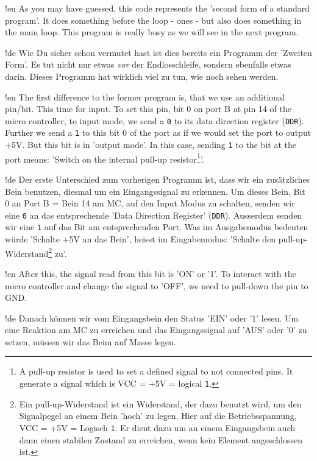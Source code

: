 !en As you may have guessed, this code represents the 'second form of a standard program'. It does something before the loop - ones - but also does something in the main loop. This program is really busy as we will see in the next program.

!de Wie Du sicher schon vermutet hast ist dies bereits ein Programm der 'Zweiten Form'. Es tut nicht nur etwas \textit{vor} der Endlosschleife, sondern ebenfalls etwas darin. Dieses Programm hat wirklich viel zu tun, wie noch sehen werden.



!en The first difference to the former program is, that we use an additional pin/bit. This time for input. To set this pin, bit 0 on port B at pin 14 of the micro controller, to input mode, we send a \texttt{0} to its data direction register (\texttt{DDR}). Further we send a \texttt{1} to this bit 0 of the port as if we would set the port to output +5V. But this bit is in 'output mode'. In this case, sending \texttt{1} to the bit at the port means: 'Switch on the internal pull-up resistor\footnote{A pull-up resistor is used to set a defined signal to not connected pins. It generate a signal which is VCC = +5V = logical \texttt{1}.}'.

!de Der erste Unterschied zum vorherigen Programm ist, dass wir ein zusätzliches Bein benutzen, diesmal um ein Eingangssignal zu erkennen. Um dieses Bein, Bit 0 an Port B = Bein 14 am MC, auf den Input Modus zu schalten, senden wir eine \texttt{0} an das entsprechende 'Data Direction Register' (\texttt{DDR}). Ausserdem senden wir eine \texttt{1} auf das Bit am entsprechenden Port. Was im Ausgabemodus bedeuten würde 'Schalte +5V an das Bein', heisst im Eingabemodus: 'Schalte den pull-up-Widerstand\footnote{Ein pull-up-Widerstand ist ein Widerstand, der dazu benutzt wird, um den Signalpegel an einem Bein 'hoch' zu legen. Hier auf die Betriebsspannung, VCC = +5V = Logisch \texttt{1}. Er dient dazu um an einem Eingangsbein auch dann einen stabilen Zustand zu erreichen, wenn kein Element angeschlossen ist.} zu'.



!en After this, the signal read from this bit is 'ON' or '1'. To interact with the micro controller and change the signal to 'OFF', we need to pull-down the pin to GND.

!de Danach können wir vom Eingangsbein den Status 'EIN' oder '1' lesen. Um eine Reaktion am MC zu erreichen und das Eingangssignal auf 'AUS' oder '0' zu setzen, müssen wir das Beim auf Masse legen.



